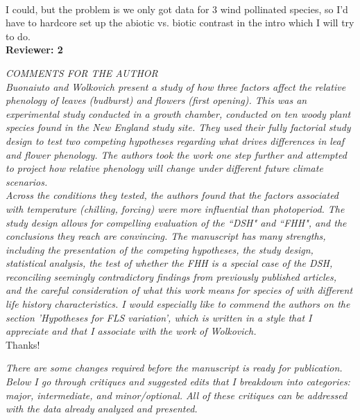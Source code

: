 \documentclass[11pt]{article}
\begin{document}
\\

I could, but the problem is we only got data for 3 wind pollinated species, so I'd have to hardcore set up the abiotic vs. biotic contrast in the intro which I will try to do.\\

\textbf{Reviewer: 2}

\emph{COMMENTS FOR THE AUTHOR}\\
\emph{Buonaiuto and Wolkovich present a study of how three factors affect the relative phenology of leaves (budburst) and flowers (first opening).  This was an experimental study conducted in a growth chamber, conducted on ten woody plant species found in the New England study site. They used their fully factorial study design to test two competing hypotheses regarding what drives differences in leaf and flower phenology. The authors took the work one step further and attempted to project how relative phenology will change under different future climate scenarios.\\

Across the conditions they tested, the authors found that the factors associated with temperature (chilling, forcing) were more influential than photoperiod. The study design allows for compelling evaluation of the ``DSH" and ``FHH", and the conclusions they reach are convincing. The manuscript has many strengths, including the presentation of the competing hypotheses, the study design, statistical analysis, the test of whether the FHH is a special case of the DSH, reconciling seemingly contradictory findings from previously published articles, and the careful consideration of what this work means for species of with different life history characteristics. I would especially like to commend the authors on the section 'Hypotheses for FLS variation', which is written in a style that I appreciate and that I associate with the work of Wolkovich.}\\

Thanks!

\emph{There are some changes required before the manuscript is ready for publication. Below I go through critiques and suggested edits that I breakdown into categories: major, intermediate, and minor/optional. All of these critiques can be addressed with the data already analyzed and presented.}\\
\end{document}
